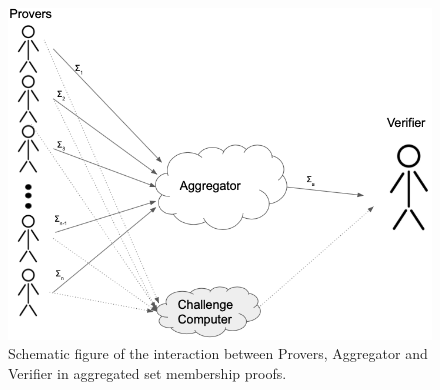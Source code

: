  \begin{figure}
\includegraphics[width=\linewidth]{./figure/oneagg.png}
\caption{Schematic figure of the interaction between Provers, Aggregator and Verifier in aggregated set membership proofs. }
\label{fig:gen_workflow}
\end{figure} 




